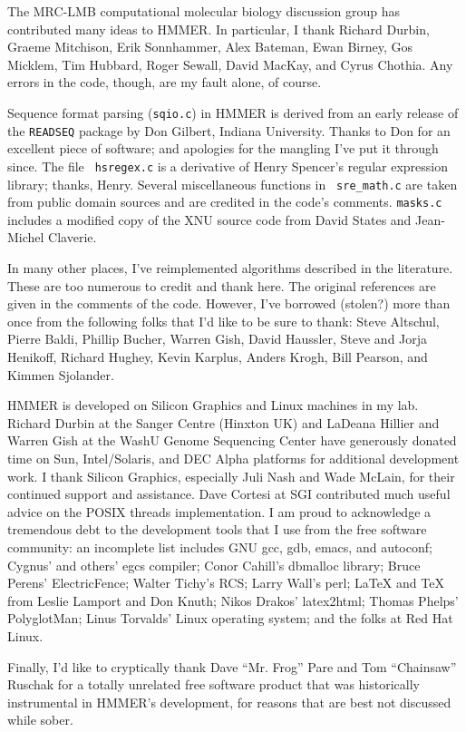 The MRC-LMB computational molecular biology discussion group has
contributed many ideas to HMMER. In particular, I thank Richard
Durbin, Graeme Mitchison, Erik Sonnhammer, Alex Bateman, Ewan Birney,
Gos Micklem, Tim Hubbard, Roger Sewall, David MacKay, and Cyrus
Chothia. Any errors in the code, though, are my fault alone, of
course.

Sequence format parsing ({\tt sqio.c}) in HMMER is derived from an
early release of the {\tt READSEQ} package by Don Gilbert, Indiana
University. Thanks to Don for an excellent piece of software; and
apologies for the mangling I've put it through since.  The file {\tt
hsregex.c} is a derivative of Henry Spencer's regular expression
library; thanks, Henry. Several miscellaneous functions in {\tt
sre\_math.c} are taken from public domain sources and are credited in
the code's comments. {\tt masks.c} includes a modified copy of the XNU
source code from David States and Jean-Michel Claverie.

In many other places, I've reimplemented algorithms described in the
literature. These are too numerous to credit and thank here. The
original references are given in the comments of the code. However,
I've borrowed (stolen?) more than once from the following folks that
I'd like to be sure to thank: Steve Altschul, Pierre Baldi, Phillip
Bucher, Warren Gish, David Haussler, Steve and Jorja Henikoff, Richard
Hughey, Kevin Karplus, Anders Krogh, Bill Pearson, and Kimmen
Sjolander.

HMMER is developed on Silicon Graphics and Linux machines in my lab.
Richard Durbin at the Sanger Centre (Hinxton UK) and LaDeana Hillier
and Warren Gish at the WashU Genome Sequencing Center have generously
donated time on Sun, Intel/Solaris, and DEC Alpha platforms for
additional development work. I thank Silicon Graphics, especially Juli
Nash and Wade McLain, for their continued support and assistance. Dave
Cortesi at SGI contributed much useful advice on the POSIX threads
implementation. I am proud to acknowledge a tremendous debt to the
development tools that I use from the free software community: an
incomplete list includes GNU gcc, gdb, emacs, and autoconf; Cygnus'
and others' egcs compiler; Conor Cahill's dbmalloc library; Bruce
Perens' ElectricFence; Walter Tichy's RCS; Larry Wall's perl; LaTeX
and TeX from Leslie Lamport and Don Knuth; Nikos Drakos' latex2html;
Thomas Phelps' PolyglotMan; Linus Torvalds' Linux operating system;
and the folks at Red Hat Linux.

Finally, I'd like to cryptically thank Dave ``Mr. Frog'' Pare and Tom
``Chainsaw'' Ruschak for a totally unrelated free software product
that was historically instrumental in HMMER's development, for reasons
that are best not discussed while sober.
